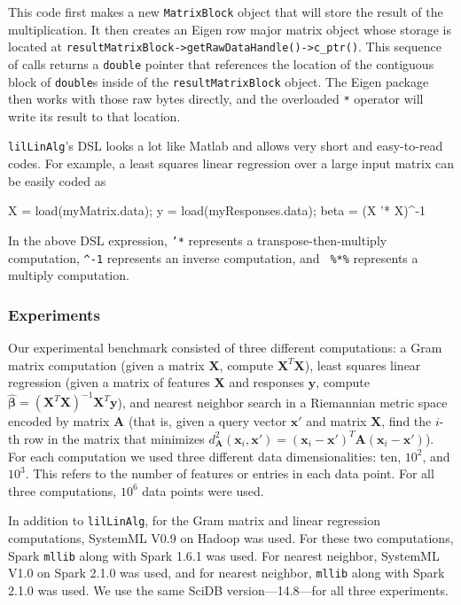 \noindent This code first makes a new \texttt{MatrixBlock} object that will store the result of the multiplication.
 It then creates an 
Eigen row major matrix object whose storage is located at 
\texttt{resultMatrixBlock->}\-\texttt{getRaw}\-\texttt{DataHandle()->}\-\texttt{c\_ptr()}.  This
sequence of calls
returns a \texttt{double} pointer that references the location of the contiguous block of \texttt{double}s inside of
the \texttt{resultMatrixBlock} object.
The Eigen package then works with those raw bytes directly,
and the overloaded \texttt{*} operator will write its result to that location.

\texttt{lilLinAlg}'s DSL looks a lot like Matlab and allows very short and easy-to-read codes.
For example, 
a least squares linear regression over a large input matrix can be easily coded as

\begin{code}
X = load(myMatrix.data); 
y = load(myResponses.data); 
beta = (X '* X)^-1 %
\end{code}

\noindent In the above DSL expression, \texttt{'*} represents a transpose-then-multiply computation,
\texttt{\^{}-1} represents an inverse computation, and \texttt{ \%*\%}
represents a multiply computation. 

\subsubsection {Experiments}

Our experimental benchmark consisted of three different computations:
a Gram matrix computation (given a matrix $\textbf{X}$, compute
$\textbf{X}^T \textbf{X}$), least squares linear regression (given a matrix of features $\textbf{X}$ and
responses $\textbf{y}$, compute 
$\hat{\pmb{\beta}} = (\textbf{X}^{T} \textbf{X})^{-1} \textbf{X}^{T} \textbf{y}$), and nearest
neighbor search in a Riemannian metric space \cite{lebanon2006metric} encoded by matrix $\textbf{A}$ (that is,
given a query vector
$\textbf{x}'$ and matrix $\textbf{X}$, find the $i$-th row in the matrix that minimizes 
$d_{\textbf{A}}^2(\textbf{x}_i, \textbf{x}') = 
(\textbf{x}_i - \textbf{x}')^T\textbf{A}(\textbf{x}_i - \textbf{x}')$).  
For each computation we used three different data dimensionalities: ten, $10^2$, and $10^3$.  This refers to
the number of features or entries in each data point. 
For
all three computations, 
$10^6$ data points were used. 

In addition to \texttt{lilLinAlg}, 
for the Gram matrix and linear regression computations, SystemML V0.9 on Hadoop was used.
For these two computations, Spark \texttt{mllib} along with
Spark 1.6.1 was used.  For
nearest neighbor, SystemML V1.0 on Spark 2.1.0 was used, and for
nearest neighbor, \texttt{mllib} along with Spark 2.1.0 was used. We
use the same SciDB version---14.8---for all three
experiments.

